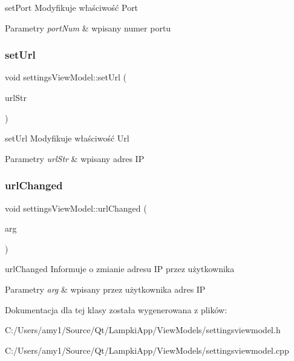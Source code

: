 set\+Port Modyfikuje właściwość Port 


\begin{DoxyParams}{Parametry}
{\em port\+Num} & wpisany numer portu \\
\hline
\end{DoxyParams}
\mbox{\label{classsettings_view_model_a2ffae7dd1ad8acfa8179366bdba7ec19}} 
\subsubsection{\texorpdfstring{set\+Url}{setUrl}}
{\footnotesize\ttfamily void settings\+View\+Model\+::set\+Url (\begin{DoxyParamCaption}\item[{Q\+String}]{url\+Str }\end{DoxyParamCaption})\hspace{0.3cm}{\ttfamily [slot]}}



set\+Url Modyfikuje właściwość Url 


\begin{DoxyParams}{Parametry}
{\em url\+Str} & wpisany adres IP \\
\hline
\end{DoxyParams}
\mbox{\label{classsettings_view_model_a7e9a10f475bc4b11ec576cf527070d10}} 
\subsubsection{\texorpdfstring{url\+Changed}{urlChanged}}
{\footnotesize\ttfamily void settings\+View\+Model\+::url\+Changed (\begin{DoxyParamCaption}\item[{Q\+String}]{arg }\end{DoxyParamCaption})\hspace{0.3cm}{\ttfamily [signal]}}



url\+Changed Informuje o zmianie adresu IP przez użytkownika 


\begin{DoxyParams}{Parametry}
{\em arg} & wpisany przez użytkownika adres IP \\
\hline
\end{DoxyParams}


Dokumentacja dla tej klasy została wygenerowana z plików\+:\begin{DoxyCompactItemize}
\item 
C\+:/\+Users/amy1/\+Source/\+Qt/\+Lampki\+App/\+View\+Models/settingsviewmodel.\+h\item 
C\+:/\+Users/amy1/\+Source/\+Qt/\+Lampki\+App/\+View\+Models/settingsviewmodel.\+cpp\end{DoxyCompactItemize}
